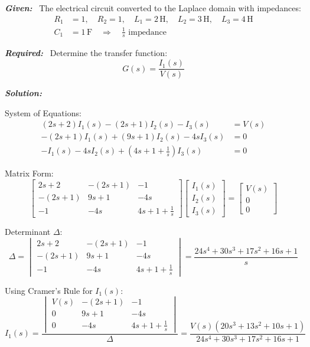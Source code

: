 \documentclass[11pt]{article}
\begin{document}
\vspace{12pt}


\noindent
\textbf{\textit{Given:}}  
\ The electrical circuit converted to the Laplace domain with impedances:
\[
\begin{aligned}
R_1 &= 1, \quad R_2 = 1, \quad L_1 = 2\, \text{H}, \quad L_2 = 3\, \text{H}, \quad L_3 = 4\, \text{H} \\
C_1 &= 1\, \text{F} \quad \Rightarrow \quad \frac{1}{s} \text{ impedance}
\end{aligned}
\]
\vspace{12pt}

\noindent
\textbf{\textit{Required:}}
    \ Determine the transfer function:
    \[
    G(s) = \frac{I_1(s)}{V(s)}
    \]
\vspace{12pt}

\noindent \textbf{\textit{Solution:}}

\bigskip

{System of Equations:}
\[
\begin{aligned}
(2s + 2)I_1(s) - (2s + 1)I_2(s) - I_3(s) &= V(s) \\
-(2s + 1)I_1(s) + (9s + 1)I_2(s) - 4s I_3(s) &= 0 \\
- I_1(s) - 4s I_2(s) + \left(4s + 1 + \frac{1}{s}\right)I_3(s) &= 0
\end{aligned}
\]

{Matrix Form:}
\[
\begin{bmatrix}
2s + 2 & -(2s + 1) & -1 \\
-(2s + 1) & 9s + 1 & -4s \\
-1 & -4s & 4s + 1 + \frac{1}{s}
\end{bmatrix}
\begin{bmatrix}
I_1(s) \\ I_2(s) \\ I_3(s)
\end{bmatrix}
=
\begin{bmatrix}
V(s) \\ 0 \\ 0
\end{bmatrix}
\]

{Determinant \(\Delta\):}
\[
\Delta =
\begin{vmatrix}
2s + 2 & -(2s + 1) & -1 \\
-(2s + 1) & 9s + 1 & -4s \\
-1 & -4s & 4s + 1 + \frac{1}{s}
\end{vmatrix}
= \frac{24s^4 + 30s^3 + 17s^2 + 16s + 1}{s}
\]

{Using Cramer's Rule for \(I_1(s)\):}
\[
I_1(s) =
\frac{
\begin{vmatrix}
V(s) & -(2s + 1) & -1 \\
0 & 9s + 1 & -4s \\
0 & -4s & 4s + 1 + \frac{1}{s}
\end{vmatrix}
}
{\Delta}
= \frac{V(s)\left(20s^3 + 13s^2 + 10s + 1\right)}{24s^4 + 30s^3 + 17s^2 + 16s + 1}
\]
\end{document}
